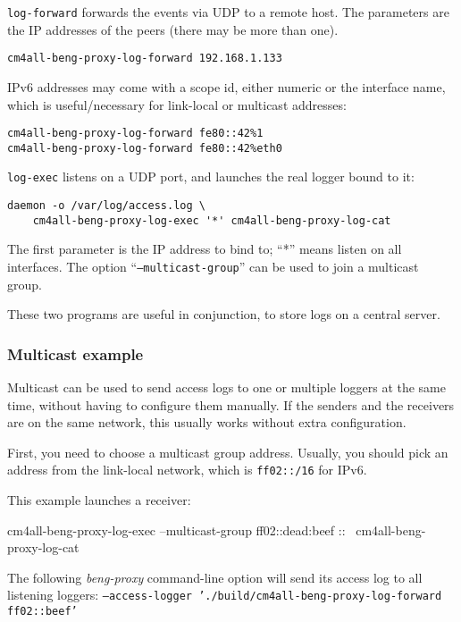\documentclass[a4paper,12pt]{article}
\begin{document}
\texttt{log-forward} forwards the events via UDP to a remote host.
The parameters are the IP addresses of the peers (there may be more
than one).

\begin{verbatim}
cm4all-beng-proxy-log-forward 192.168.1.133
\end{verbatim}

IPv6 addresses may come with a scope id, either numeric or the
interface name, which is useful/necessary for link-local or multicast
addresses:

\begin{verbatim}
cm4all-beng-proxy-log-forward fe80::42%1
cm4all-beng-proxy-log-forward fe80::42%eth0
\end{verbatim}

\texttt{log-exec} listens on a UDP port, and launches the real logger
bound to it:

\begin{verbatim}
daemon -o /var/log/access.log \
    cm4all-beng-proxy-log-exec '*' cm4all-beng-proxy-log-cat
\end{verbatim}

The first parameter is the IP address to bind to; ``*'' means listen
on all interfaces.  The option ``\texttt{--multicast-group}'' can be
used to join a multicast group.

These two programs are useful in conjunction, to store logs on a
central server.

\subsubsection{Multicast example}

Multicast can be used to send access logs to one or multiple loggers
at the same time, without having to configure them manually.  If the
senders and the receivers are on the same network, this usually works
without extra configuration.

First, you need to choose a multicast group address.  Usually, you
should pick an address from the link-local network, which is
\texttt{ff02::/16} for IPv6.

This example launches a receiver:

\begin{verbatim*}
cm4all-beng-proxy-log-exec --multicast-group ff02::dead:beef :: \
  cm4all-beng-proxy-log-cat
\end{verbatim*}

The following \emph{beng-proxy} command-line option will send its
access log to all listening loggers: \texttt{--access-logger
  './build/cm4all-beng-proxy-log-forward ff02::beef'}
\end{document}
